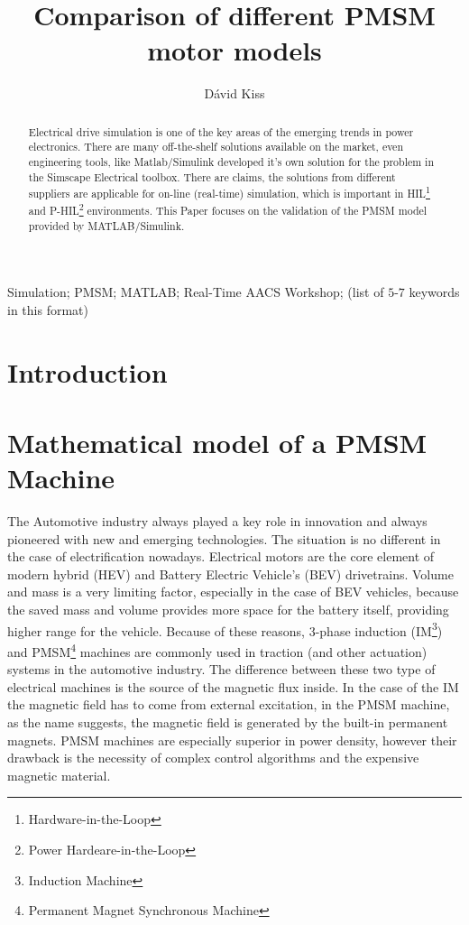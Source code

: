 \documentclass[twoside,b5paper,10pt]{article}
\title{Comparison of different PMSM motor models}
\author{Dávid Kiss}
\begin{document}
\makeAutStyleTitle

\begin{abstract}
Electrical drive simulation is one of the key areas of the emerging trends in power electronics. There are many off-the-shelf solutions available on the market, even engineering tools, like Matlab/Simulink developed it's own solution for the problem in the Simscape Electrical toolbox. There are claims, the solutions from different suppliers are applicable for on-line (real-time) simulation, which is important in HIL\footnote{Hardware-in-the-Loop} and P-HIL\footnote{Power Hardeare-in-the-Loop} environments. This Paper focuses on the validation of the PMSM model provided by MATLAB/Simulink.
\end{abstract}


\begin{keywords}
Simulation; PMSM; MATLAB; Real-Time AACS Workshop; (list of $5$-$7$ keywords in this
format)
\end{keywords}

\listoftodos

\section{Introduction}
\label{sec:Introdu}


\section{Mathematical model of a PMSM Machine}
\label{sec:matPMSM}

The Automotive industry always played a key role in innovation and always pioneered with new and emerging technologies. The situation is no different in the case of electrification nowadays. Electrical motors are the core element of modern hybrid (HEV) and Battery Electric Vehicle's (BEV) drivetrains. Volume and mass is a very limiting factor, especially in the case of BEV vehicles, because the saved mass and volume provides more space for the battery itself, providing higher range for the vehicle. Because of these reasons, 3-phase induction (IM\footnote{Induction Machine}) and PMSM\footnote{Permanent Magnet Synchronous Machine} machines are commonly used in traction (and other actuation) systems in the automotive industry. The difference between these two type of electrical machines is the source of the magnetic flux inside. In the case of the IM the magnetic field has to come from external excitation, in the PMSM machine, as the name suggests, the magnetic field is generated by the built-in permanent magnets. PMSM machines are especially superior in power density, however their drawback is the necessity of complex control algorithms and the expensive magnetic material.
\end{document}
